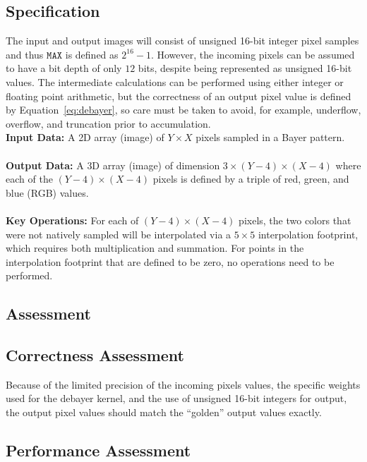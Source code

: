 \documentclass{report}
\begin{document}
\subsection{Specification}
\label{sec:wami:debayer:spec}

The input and output images will consist of unsigned 16-bit integer pixel samples
and thus $\texttt{MAX}$ is defined as $2^{16}-1$.
However, the incoming pixels can be assumed to have a bit depth of only $12$ bits,
despite being represented as unsigned 16-bit values.
The intermediate calculations can be performed using either integer or floating
point arithmetic, but the correctness of an output pixel value is defined
by Equation~\ref{eq:debayer}, so care must be taken to avoid, for example,
underflow, overflow, and truncation prior to accumulation. \\

\noindent \textbf{Input Data:} A {2D} array (image) of $Y \times X$ pixels sampled in
a Bayer pattern. \\ \\
\textbf{Output Data:} A {3D} array (image) of dimension $3 \times (Y-4) \times (X-4)$
where each of the $(Y-4) \times (X-4)$ pixels is defined by a triple of
red, green, and blue (RGB) values. \\ \\
\textbf{Key Operations:} For each of $(Y-4) \times (X-4)$ pixels,
the two colors that were not natively sampled will be interpolated via a
$5 \times 5$ interpolation footprint, which requires both multiplication
and summation.
For points in the interpolation footprint that are defined to be zero,
no operations need to be performed.

\subsection{Assessment}

\subsection{Correctness Assessment}

Because of the limited precision of the incoming pixels values, the specific weights
used for the debayer kernel, and the use of unsigned 16-bit integers for output,
the output pixel values should match the ``golden'' output values exactly.

\subsection{Performance Assessment}
\end{document}
